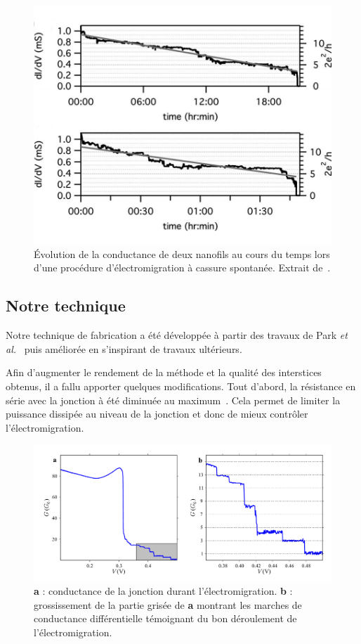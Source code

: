 \begin{figure}
\parbox{7cm}{
\includegraphics[scale=0.45]{Fabrication/ElecMigExemp/ZantFig.pdf} 
}
\parbox{5cm}{\caption{Évolution de la conductance de deux nanofils au cours du temps lors d'une procédure d'électromigration à cassure spontanée. Extrait de~\cite{ONeill2007}.}
\label{ZantExemp}
}
\end{figure}



\subsection{Notre technique}
Notre technique de fabrication a été développée à partir des travaux de Park \textit{et al.}~\cite{Park1999} puis améliorée en s'inspirant de travaux ultérieurs.

Afin d'augmenter le rendement de la méthode et la qualité des interstices obtenus, il a fallu apporter quelques modifications. Tout d’abord, la résistance en série avec la jonction à été diminuée au maximum~\cite{Zant2006,Trouwborst2006,Taychatanapat2007}. Cela permet de limiter la puissance dissipée au niveau de la jonction et donc de mieux contrôler l'électromigration.

\begin{figure}
\centering \includegraphics[scale=0.45]{Fabrication/NotreElectroMig/NotreElectroMig.pdf}
\caption{\textbf{a} : conductance de la jonction durant l'électromigration. \textbf{b} : grossissement de la partie grisée de \textbf{a} montrant les marches de conductance différentielle témoignant du bon déroulement de l'électromigration.}
\label{NotreElecMig}
\end{figure}


